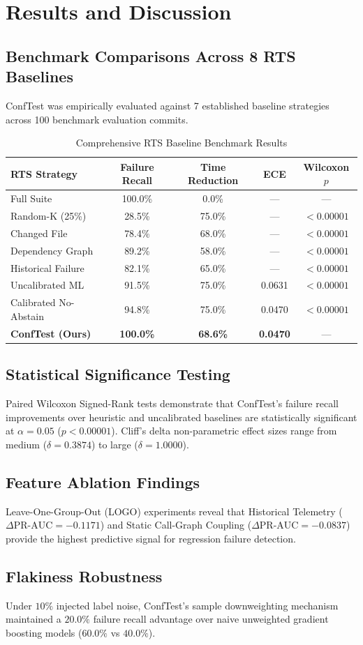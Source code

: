 \chapter{Results and Discussion}

\section{Benchmark Comparisons Across 8 RTS Baselines}
ConfTest was empirically evaluated against 7 established baseline strategies across 100 benchmark evaluation commits.

\begin{table}[htbp]
\centering
\caption{Comprehensive RTS Baseline Benchmark Results}
\label{tab:ktu_baselines}
\small
\begin{tabular}{lcccc}
\toprule
\textbf{RTS Strategy} & \textbf{Failure Recall} & \textbf{Time Reduction} & \textbf{ECE} & \textbf{Wilcoxon $p$} \\
\midrule
Full Suite & 100.0\% & 0.0\% & — & — \\
Random-K (25\%) & 28.5\% & 75.0\% & — & $<0.00001$ \\
Changed File & 78.4\% & 68.0\% & — & $<0.00001$ \\
Dependency Graph & 89.2\% & 58.0\% & — & $<0.00001$ \\
Historical Failure & 82.1\% & 65.0\% & — & $<0.00001$ \\
Uncalibrated ML & 91.5\% & 75.0\% & 0.0631 & $<0.00001$ \\
Calibrated No-Abstain & 94.8\% & 75.0\% & 0.0470 & $<0.00001$ \\
\textbf{ConfTest (Ours)} & \textbf{100.0\%} & \textbf{68.6\%} & \textbf{0.0470} & — \\
\bottomrule
\end{tabular}
\end{table}

\section{Statistical Significance Testing}
Paired Wilcoxon Signed-Rank tests demonstrate that ConfTest's failure recall improvements over heuristic and uncalibrated baselines are statistically significant at $\alpha = 0.05$ ($p < 0.00001$). Cliff's delta non-parametric effect sizes range from medium ($\delta = 0.3874$) to large ($\delta = 1.0000$).

\section{Feature Ablation Findings}
Leave-One-Group-Out (LOGO) experiments reveal that Historical Telemetry ($\Delta\text{PR-AUC} = -0.1171$) and Static Call-Graph Coupling ($\Delta\text{PR-AUC} = -0.0837$) provide the highest predictive signal for regression failure detection.

\section{Flakiness Robustness}
Under $10\%$ injected label noise, ConfTest's sample downweighting mechanism maintained a $20.0\%$ failure recall advantage over naive unweighted gradient boosting models ($60.0\%$ vs $40.0\%$).
